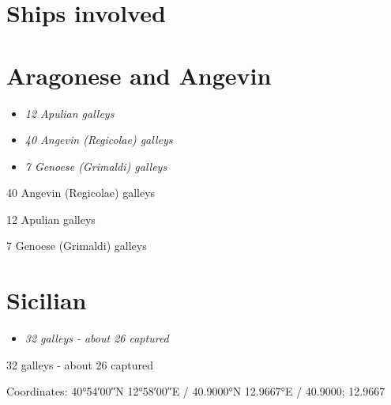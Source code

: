 \section{Ships involved}\label{ships-involved}

\section{Aragonese and Angevin}\label{aragonese-and-angevin}

\begin{itemize}
\item
  \emph{12 Apulian galleys}
\item
  \emph{40 Angevin (Regicolae) galleys}
\item
  \emph{7 Genoese (Grimaldi) galleys}
\end{itemize}

40 Angevin (Regicolae) galleys

12 Apulian galleys

7 Genoese (Grimaldi) galleys

\section{Sicilian}\label{sicilian}

\begin{itemize}
\item
  \emph{32 galleys - about 26 captured}
\end{itemize}

32 galleys - about 26 captured

Coordinates: 40°54′00″N 12°58′00″E﻿ / ﻿40.9000°N 12.9667°E﻿ / 40.9000;
12.9667
